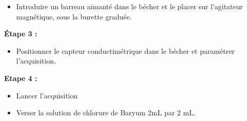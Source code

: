 \documentclass[11pt,a4paper]{article}
\begin{document}
\begin{enumerate}
\begin{center}
{\begin{minipage}{15cm}
\begin{itemize}
    \item Introduire un barreau aimanté dans le bécher et le placer sur l'agitateur magnétique, sous la burette graduée. 
    
    \end{itemize}

   \textbf{ Étape 3  : }
    \begin{itemize}
        \item Positionner le capteur conductimétrique dans le bécher et paramétrer l'acquisition. 
    \end{itemize}

    \textbf{Etape 4 : }
    \begin{itemize}
        \item Lancer l'acquisition 
        \item Verser la solution de chlorure de Baryum 2mL par 2 mL. 
    \end{itemize}

    \vspace{2mm}

    
\end{minipage}
}
\end{center}

\vfill 
\end{enumerate}
\end{document}
